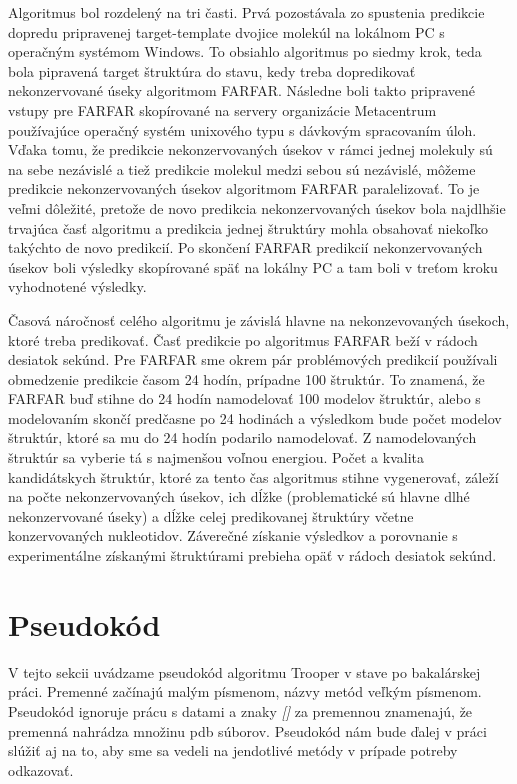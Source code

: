 \indent Algoritmus bol rozdelený na tri časti. Prvá pozostávala zo spustenia predikcie dopredu pripravenej target-template dvojice molekúl na lokálnom PC s operačným systémom Windows. To obsiahlo algoritmus  po siedmy krok, teda bola pipravená target štruktúra do stavu, kedy treba dopredikovať nekonzervované úseky algoritmom FARFAR. Následne boli takto pripravené vstupy pre FARFAR skopírované na servery organizácie Metacentrum používajúce operačný systém unixového typu s dávkovým spracovaním úloh. Vďaka tomu, že predikcie nekonzervovaných úsekov v rámci jednej molekuly sú na sebe nezávislé a tiež predikcie molekul medzi sebou sú nezávislé, môžeme predikcie nekonzervovaných úsekov algoritmom FARFAR paralelizovať. To je veľmi dôležité, pretože de novo predikcia nekonzervovaných úsekov bola najdlhšie trvajúca časť algoritmu a predikcia jednej štruktúry mohla obsahovať niekoľko takýchto de novo predikcií.  Po skončení FARFAR predikcií nekonzervovaných úsekov boli výsledky skopírované späť na lokálny PC a tam boli v treťom kroku vyhodnotené výsledky. 


\indent Časová náročnosť celého algoritmu je závislá hlavne na nekonzevovaných úsekoch, ktoré treba predikovať. Časť predikcie po algoritmus FARFAR beží v rádoch desiatok sekúnd. Pre FARFAR sme okrem pár problémových predikcií používali obmedzenie predikcie časom 24 hodín, prípadne 100 štruktúr. To znamená, že FARFAR buď stihne do 24 hodín namodelovať 100 modelov štruktúr, alebo s modelovaním skončí predčasne po 24 hodinách a výsledkom bude počet modelov štruktúr, ktoré sa mu do 24 hodín podarilo namodelovať. Z namodelovaných štruktúr sa vyberie tá s najmenšou voľnou energiou. Počet a kvalita kandidátskych štruktúr, ktoré za tento čas algoritmus stihne vygenerovať, záleží na počte nekonzervovaných úsekov, ich dĺžke (problematické sú hlavne dlhé nekonzervované úseky) a dĺžke celej predikovanej štruktúry včetne konzervovaných nukleotidov. Záverečné získanie výsledkov a porovnanie s experimentálne získanými štruktúrami prebieha opäť v rádoch desiatok sekúnd.


\section{Pseudokód}\label{kap3:pseudocode}
V tejto sekcii uvádzame pseudokód algoritmu Trooper v stave po bakalárskej práci. Premenné  začínajú malým písmenom, názvy metód veľkým písmenom. Pseudokód ignoruje prácu s datami a znaky \textit{[]} za premennou znamenajú, že premenná nahrádza množinu pdb súborov. Pseudokód nám bude ďalej v práci slúžiť aj na to, aby sme sa vedeli na jendotlivé metódy v prípade potreby odkazovať.


